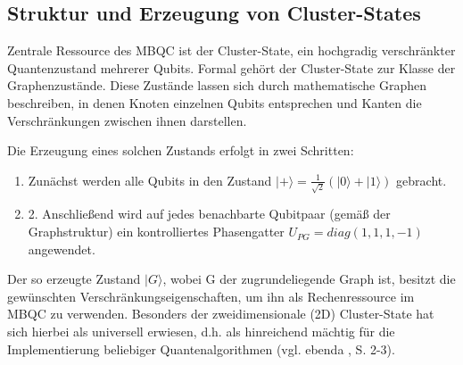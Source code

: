 \subsection*{Struktur und Erzeugung von Cluster-States}
Zentrale Ressource des MBQC ist der Cluster-State, ein hochgradig verschränkter Quantenzustand mehrerer Qubits. Formal gehört der Cluster-State zur Klasse der Graphenzustände. Diese Zustände lassen sich durch mathematische Graphen beschreiben, in denen Knoten einzelnen Qubits entsprechen und Kanten die Verschränkungen zwischen ihnen darstellen.

Die Erzeugung eines solchen Zustands erfolgt in zwei Schritten:
\begin{enumerate}
    \item 	Zunächst werden alle Qubits in den Zustand $|+\rangle = \frac{1}{\sqrt{2}}(|0\rangle + |1\rangle)$ gebracht.
    \item 2.	Anschließend wird auf jedes benachbarte Qubitpaar (gemäß der Graphstruktur) ein kontrolliertes Phasengatter $U_{PG}=diag(1,1,1,-1)$ angewendet.
\end{enumerate}
Der so erzeugte Zustand $|G\rangle$, wobei G der zugrundeliegende Graph ist, besitzt die gewünschten Verschränkungseigenschaften, um ihn als Rechenressource im MBQC zu verwenden. Besonders der zweidimensionale (2D) Cluster-State hat sich hierbei als universell erwiesen, d.h. als hinreichend mächtig für die Implementierung beliebiger Quantenalgorithmen (vgl. ebenda \citeyear{h_j_briegel_measurement-based_2009}, S. 2-3).
